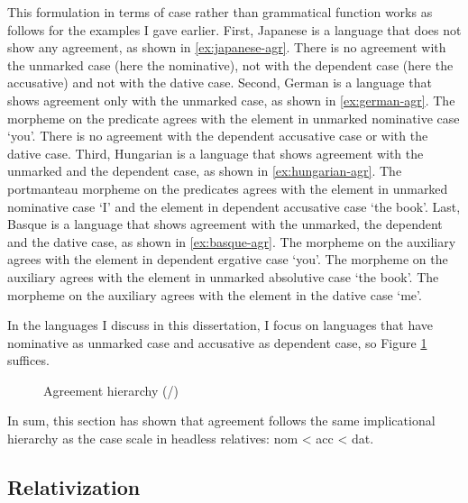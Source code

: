 This formulation in terms of case rather than grammatical function works as follows for the examples I gave earlier.
First, Japanese is a language that does not show any agreement, as shown in \ref{ex:japanese-agr}. There is no agreement with the unmarked case (here the nominative), not with the dependent case (here the accusative) and not with the dative case.
Second, German is a language that shows agreement only with the unmarked case, as shown in \ref{ex:german-agr}. The morpheme  on the predicate agrees with the element in unmarked nominative case  `you'. There is no agreement with the dependent accusative case or with the dative case.
Third, Hungarian is a language that shows agreement with the unmarked and the dependent case, as shown in \ref{ex:hungarian-agr}. The portmanteau morpheme  on the predicates agrees with the element in unmarked nominative case  `I' and the element in dependent accusative case  `the book'.
Last, Basque is a language that shows agreement with the unmarked, the dependent and the dative case, as shown in \ref{ex:basque-agr}. The morpheme  on the auxiliary agrees with the element in dependent ergative case  `you'. The morpheme  on the auxiliary agrees with the element in unmarked absolutive case  `the book'. The morpheme  on the auxiliary agrees with the element in the dative case  `me'.

In the languages I discuss in this dissertation, I focus on languages that have nominative as unmarked case and accusative as dependent case, so Figure \ref{fig:agr-nom-acc-dat} suffices.

\begin{figure}[H]
  \centering
  \caption{Agreement hierarchy (/)}
  \label{fig:agr-nom-acc-dat}
\end{figure}

In sum, this section has shown that agreement follows the same implicational hierarchy as the case scale in headless relatives: \ac{nom} < \ac{acc} < \ac{dat}.


\subsection{Relativization}

